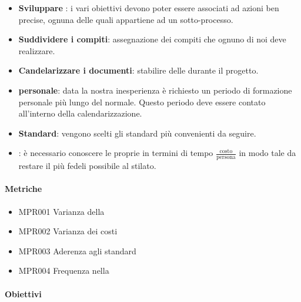 		\begin{itemize}
			\item \textbf{Sviluppare }: i vari obiettivi devono poter essere associati ad azioni ben precise, ognuna delle quali appartiene ad un sotto-processo.
			\item \textbf{Suddividere i compiti}: assegnazione dei compiti che ognuno di noi deve realizzare.
			\item \textbf{Candelarizzare i documenti}: stabilire delle  durante il progetto.
			\item \textbf{ personale}: data la nostra inesperienza è richiesto un periodo di formazione personale più lungo del normale. Questo periodo deve essere contato all'interno della calendarizzazione.
			\item \textbf{Standard}: vengono scelti gli standard più convenienti da seguire.
			\item \textbf{}: è necessario conoscere le proprie  in termini di tempo $\frac{\text{costo}}{\text{persona}}$ in modo tale da restare il più fedeli possibile al  stilato.
		\end{itemize}
	
		\paragraph*{Metriche}
		
		\begin{itemize}
			\item MPR001 Varianza della 
			\item MPR002 Varianza dei costi
			\item MPR003 Aderenza agli standard
			\item MPR004 Frequenza  nella 
		\end{itemize}
	
		\paragraph*{Obiettivi}
		
